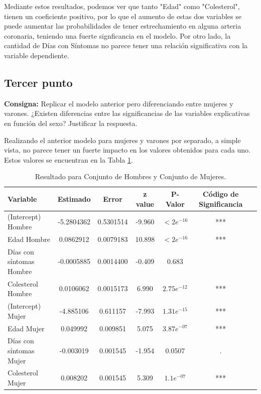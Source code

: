 \documentclass{article} %
\begin{document}
Mediante estos resultados, podemos ver que tanto "Edad" como "Colesterol", tienen un coeficiente positivo, por lo que el aumento de estas dos variables se puede aumentar las probabilidades de tener estrechamiento en alguna arteria coronaria, teniendo una fuerte signficancia en el modelo. Por otro lado, la cantidad de Días con Síntomas no parece tener una relación significativa con la variable dependiente. 


\subsection{Tercer punto}

\textbf{Consigna:} Replicar el modelo anterior pero diferenciando entre mujeres y varones. ¿Existen diferencias entre las significancias de las variables explicativas en función del sexo? Justificar la respuesta.

Realizando el anterior modelo para mujeres y varones por separado, a simple vista, no parece tener un fuerte impacto en los valores obtenidos para cada uno. Estos valores se encuentran en la Tabla \ref{tab:table-punto-2-3}.

\begin{table}[H]
	\centering
		\begin{tabular}{||l || c || c || c || c || c || c ||}
			\hline
			\hline
			Variable & Estimado & Error & z value & P-Valor & Código de Significancia\\
			\hline			
			\hline
			(Intercept) Hombre & -5.2804362 & 0.5301514 & -9.960 & $<2e^{-16}$ & ***\\
			\hline
			Edad Hombre  & 0.0862912 & 0.0079183 & 10.898 & $<2e^{-16}$ & ***\\
			\hline
			Días con síntomas Hombre & -0.0005885 & 0.0014400 & -0.409 & 0.683 & \\
			\hline
			Colesterol Hombre & 0.0106062 & 0.0015173 & 6.990 & $2.75e^{-12}$ & ***\\
			\hline
			(Intercept) Mujer & -4.885106 & 0.611157 & -7.993 & $1.31e^{-15}$ & ***\\
			\hline
			Edad Mujer  & 0.049992 & 0.009851 & 5.075 & $3.87e^{-07}$ & ***\\
			\hline
			Días con síntomas Mujer & -0.003019 & 0.001545 & -1.954 & 0.0507 & . \\
			\hline
			Colesterol Mujer & 0.008202 & 0.001545 & 5.309 & $1.1e^{-07}$ & ***\\
			\hline
			\hline
		\end{tabular}
		\caption{Resultado para Conjunto de Hombres y Conjunto de Mujeres.}
	\label{tab:table-punto-2-3}
\end{table}
\end{document}
